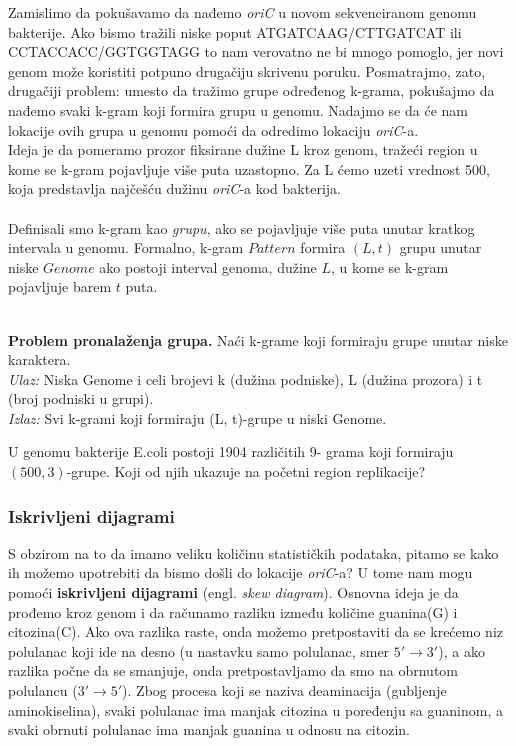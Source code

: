 Zamislimo da pokušavamo da nađemo \textit{oriC} u novom sekvenciranom genomu bakterije. Ako bismo tražili niske poput ATGATCAAG/CTTGATCAT ili CCTACCACC/GGTGGTAGG to nam verovatno ne bi mnogo pomoglo, jer novi genom može koristiti potpuno drugačiju skrivenu poruku. Posmatrajmo, zato, drugačiji problem: umesto da tražimo grupe određenog k-grama, pokušajmo da nađemo svaki k-gram koji formira grupu u genomu. Nadajmo se da će nam lokacije ovih grupa u genomu pomoći da odredimo lokaciju \textit{oriC}-a.\\Ideja je da pomeramo prozor fiksirane dužine L kroz genom, tražeći region u kome se k-gram pojavljuje više puta uzastopno. Za L ćemo uzeti vrednost 500, koja predstavlja najčešću dužinu \textit{oriC}-a kod bakterija. \\\\
Definisali smo k-gram kao \textit{grupu}, ako se pojavljuje više puta unutar kratkog intervala u genomu. Formalno, k-gram $Pattern$ formira $(L, t)$ grupu unutar niske $Genome$ ako postoji interval genoma, dužine $L$, u kome se k-gram pojavljuje barem $t$ puta. \\\\
\begin{tcolorbox}
\textbf{Problem pronalaženja grupa.} Naći k-grame koji
formiraju grupe unutar niske karaktera.\\
\textit{Ulaz:} Niska Genome i celi brojevi k (dužina
podniske), L (dužina prozora) i t (broj podniski u
grupi).\\
\textit{Izlaz:} Svi k-grami koji formiraju (L, t)-grupe u
niski Genome.
\end{tcolorbox}

U genomu bakterije E.coli postoji 1904 različitih 9-
grama koji formiraju $(500,3)$-grupe. Koji od njih
ukazuje na početni region replikacije?

\subsubsection{Iskrivljeni dijagrami}

S obzirom na to da imamo veliku količinu statističkih podataka, pitamo se kako ih možemo upotrebiti da bismo došli do lokacije \textit{oriC}-a? U tome nam mogu pomoći \textbf{iskrivljeni dijagrami} (engl. \textit{skew diagram}). Osnovna ideja je da prođemo kroz genom i da računamo razliku između količine guanina(G) i citozina(C). Ako ova razlika raste, onda možemo pretpostaviti da se krećemo niz polulanac koji ide na desno (u nastavku samo polulanac, smer $5'\longrightarrow 3'$), a ako razlika počne da se smanjuje, onda pretpostavljamo da smo na obrnutom polulancu ($3' \longrightarrow 5'$). Zbog procesa koji se naziva deaminacija (gubljenje aminokiselina), svaki polulanac ima manjak citozina u poređenju sa guaninom, a svaki obrnuti polulanac ima manjak guanina u odnosu na citozin. 


